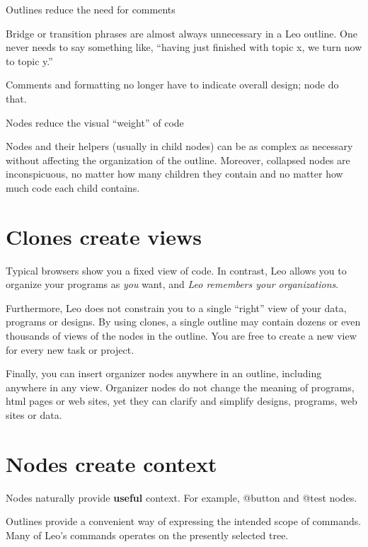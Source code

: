 \documentclass[a4paper,10pt,english]{sphinxmanual}
\begin{document}
Outlines reduce the need for comments

Bridge or transition phrases are almost always unnecessary in a
Leo outline. One never needs to say something like, ``having just finished
with topic x, we turn now to topic y.''

Comments and formatting no longer have to indicate overall design; node do that.

Nodes reduce the visual ``weight'' of code

Nodes and their helpers (usually in child nodes) can be as complex as
necessary without affecting the organization of the outline. Moreover,
collapsed nodes are inconspicuous, no matter how many children they contain
and no matter how much code each child contains.


\section{Clones create views}
\label{design:clones-create-views}
Typical browsers show you a fixed view of code. In contrast, Leo allows you to
organize your programs as \emph{you} want, and \emph{Leo remembers your organizations}.

Furthermore, Leo does not constrain you to a single ``right'' view of your data,
programs or designs. By using clones, a single outline may contain dozens or
even thousands of views of the nodes in the outline. You are free to create a
new view for every new task or project.

Finally, you can insert organizer nodes anywhere in an outline, including
anywhere in any view. Organizer nodes do not change the meaning of programs,
html pages or web sites, yet they can clarify and simplify designs, programs,
web sites or data.


\section{Nodes create context}
\label{design:nodes-create-context}
Nodes naturally provide \textbf{useful} context. For example, @button and @test nodes.

Outlines provide a convenient way of expressing the intended scope of commands.
Many of Leo's commands operates on the presently selected tree.
\end{document}
